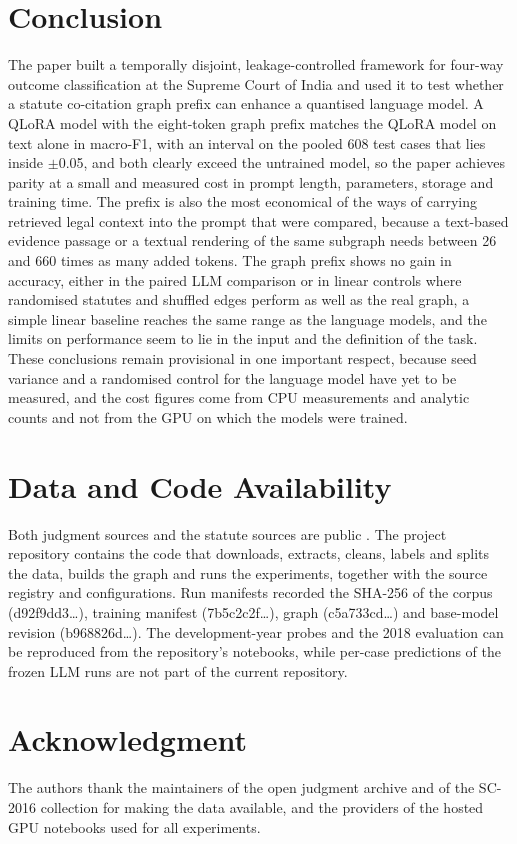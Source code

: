 \documentclass[journal]{IEEEtran}
\begin{document}
\section{Conclusion}\label{sec:conclusion}
The paper built a temporally disjoint, leakage-controlled framework for four-way outcome classification at the Supreme Court of India and used it to test whether a statute co-citation graph prefix can enhance a quantised language model. A QLoRA model with the eight-token graph prefix matches the QLoRA model on text alone in macro-F1, with an interval on the pooled 608 test cases that lies inside $\pm$0.05, and both clearly exceed the untrained model, so the paper achieves parity at a small and measured cost in prompt length, parameters, storage and training time. The prefix is also the most economical of the ways of carrying retrieved legal context into the prompt that were compared, because a text-based evidence passage or a textual rendering of the same subgraph needs between 26 and 660 times as many added tokens. The graph prefix shows no gain in accuracy, either in the paired LLM comparison or in linear controls where randomised statutes and shuffled edges perform as well as the real graph, a simple linear baseline reaches the same range as the language models, and the limits on performance seem to lie in the input and the definition of the task. These conclusions remain provisional in one important respect, because seed variance and a randomised control for the language model have yet to be measured, and the cost figures come from CPU measurements and analytic counts and not from the GPU on which the models were trained.

\section*{Data and Code Availability}
Both judgment sources and the statute sources are public \cite{r29,r30,r62}. The project repository contains the code that downloads, extracts, cleans, labels and splits the data, builds the graph and runs the experiments, together with the source registry and configurations. Run manifests recorded the SHA-256 of the corpus (d92f9dd3\ldots), training manifest (7b5c2c2f\ldots), graph (c5a733cd\ldots) and base-model revision (b968826d\ldots). The development-year probes and the 2018 evaluation can be reproduced from the repository's notebooks, while per-case predictions of the frozen LLM runs are not part of the current repository.

\section*{Acknowledgment}
The authors thank the maintainers of the open judgment archive and of the SC-2016 collection for making the data available, and the providers of the hosted GPU notebooks used for all experiments.
\end{document}
